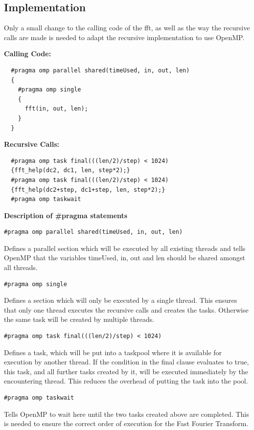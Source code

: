 \subsection{Implementation}

Only a small change to the calling code of the fft, as well as the way the recursive calls are made is needed to adapt the recursive implementation to use OpenMP.

\textbf{Calling Code:}
\begin{lstlisting}
  #pragma omp parallel shared(timeUsed, in, out, len)
  {
    #pragma omp single
    {
      fft(in, out, len);
    }
  }
\end{lstlisting}

\textbf{Recursive Calls:}
\begin{lstlisting}
  #pragma omp task final(((len/2)/step) < 1024)
  {fft_help(dc2, dc1, len, step*2);}
  #pragma omp task final(((len/2)/step) < 1024)
  {fft_help(dc2+step, dc1+step, len, step*2);}
  #pragma omp taskwait
\end{lstlisting}

\textbf{Description of #pragma statements}
\begin{lstlisting}
#pragma omp parallel shared(timeUsed, in, out, len)
\end{lstlisting}
Defines a parallel section which will be executed by all existing threads and tells OpenMP that the variables timeUsed, in, out and len should be shared amongst all threads.

\begin{lstlisting}
#pragma omp single
\end{lstlisting}
Defines a section which will only be executed by a single thread. This ensures that only one thread executes the recursive calls and creates the tasks. Otherwise the same task will be created by multiple threads.

\begin{lstlisting}
#pragma omp task final(((len/2)/step) < 1024)
\end{lstlisting}
Defines a task, which will be put into a taskpool where it is available for execution by another thread. If the condition in the final clause evaluates to true,
this task, and all further tasks created by it, will be executed immediately by the encountering thread. This reduces the overhead of putting the task into the pool.

\pagebreak
\begin{lstlisting}
#pragma omp taskwait
\end{lstlisting}
Tells OpenMP to wait here until the two tasks created above are completed. This is needed to ensure the correct order of execution for the Fast Fourier Transform.

